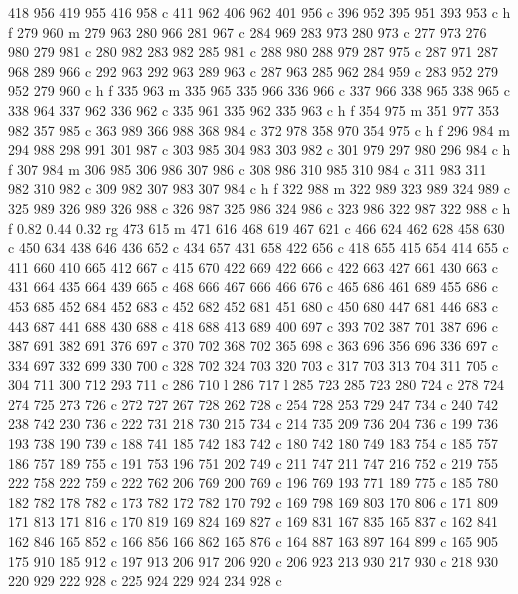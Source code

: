 {{   418 956 419 955 416 958 c
   411 962 406 962 401 956 c
   396 952 395 951 393 953 c
   h f
   279 960 m
   279 963 280 966 281 967 c
   284 969 283 973 280 973 c
   277 973 276 980 279 981 c
   280 982 283 982 285 981 c
   288 980 288 979 287 975 c
   287 971 287 968 289 966 c
   292 963 292 963 289 963 c
   287 963 285 962 284 959 c
   283 952 279 952 279 960 c
   h f
   335 963 m
   335 965 335 966 336 966 c
   337 966 338 965 338 965 c
   338 964 337 962 336 962 c
   335 961 335 962 335 963 c
   h f
   354 975 m
   351 977 353 982 357 985 c
   363 989 366 988 368 984 c
   372 978 358 970 354 975 c
   h f
   296 984 m
   294 988 298 991 301 987 c
   303 985 304 983 303 982 c
   301 979 297 980 296 984 c
   h f
   307 984 m
   306 985 306 986 307 986 c
   308 986 310 985 310 984 c
   311 983 311 982 310 982 c
   309 982 307 983 307 984 c
   h f
   322 988 m
   322 989 323 989 324 989 c
   325 989 326 989 326 988 c
   326 987 325 986 324 986 c
   323 986 322 987 322 988 c
   h f
   0.82 0.44 0.32 rg
   473 615 m
   471 616 468 619 467 621 c
   466 624 462 628 458 630 c
   450 634 438 646 436 652 c
   434 657 431 658 422 656 c
   418 655 415 654 414 655 c
   411 660 410 665 412 667 c
   415 670 422 669 422 666 c
   422 663 427 661 430 663 c
   431 664 435 664 439 665 c
   468 666 467 666 466 676 c
   465 686 461 689 455 686 c
   453 685 452 684 452 683 c
   452 682 452 681 451 680 c
   450 680 447 681 446 683 c
   443 687 441 688 430 688 c
   418 688 413 689 400 697 c
   393 702 387 701 387 696 c
   387 691 382 691 376 697 c
   370 702 368 702 365 698 c
   363 696 356 696 336 697 c
   334 697 332 699 330 700 c
   328 702 324 703 320 703 c
   317 703 313 704 311 705 c
   304 711 300 712 293 711 c
   286 710 l
   286 717 l
   285 723 285 723 280 724 c
   278 724 274 725 273 726 c
   272 727 267 728 262 728 c
   254 728 253 729 247 734 c
   240 742 238 742 230 736 c
   222 731 218 730 215 734 c
   214 735 209 736 204 736 c
   199 736 193 738 190 739 c
   188 741 185 742 183 742 c
   180 742 180 749 183 754 c
   185 757 186 757 189 755 c
   191 753 196 751 202 749 c
   211 747 211 747 216 752 c
   219 755 222 758 222 759 c
   222 762 206 769 200 769 c
   196 769 193 771 189 775 c
   185 780 182 782 178 782 c
   173 782 172 782 170 792 c
   169 798 169 803 170 806 c
   171 809 171 813 171 816 c
   170 819 169 824 169 827 c
   169 831 167 835 165 837 c
   162 841 162 846 165 852 c
   166 856 166 862 165 876 c
   164 887 163 897 164 899 c
   165 905 175 910 185 912 c
   197 913 206 917 206 920 c
   206 923 213 930 217 930 c
   218 930 220 929 222 928 c
   225 924 229 924 234 928 c
}}
